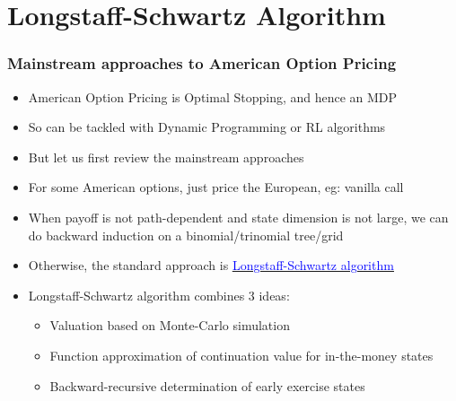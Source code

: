 \documentclass[handout]{beamer}
\begin{document}
\section{Longstaff-Schwartz Algorithm}

\begin{frame}
\frametitle{Mainstream approaches to American Option Pricing}
\pause
\begin{itemize}[<+->]
\item American Option Pricing is Optimal Stopping, and hence an MDP
\item So can be tackled with Dynamic Programming or RL algorithms
\item But let us first review the mainstream approaches
\item For some American options, just price the European, eg: vanilla call
\item When payoff is not path-dependent and state dimension is not large, we can do backward induction on a binomial/trinomial tree/grid
\item Otherwise, the standard approach is \href{https://people.math.ethz.ch/~hjfurrer/teaching/LongstaffSchwartzAmericanOptionsLeastSquareMonteCarlo.pdf}{\underline{\textcolor{blue}{Longstaff-Schwartz algorithm}}}
\item Longstaff-Schwartz algorithm combines 3 ideas:
\begin{itemize}
\item Valuation based on Monte-Carlo simulation
\item Function approximation of continuation value for in-the-money states
\item Backward-recursive determination of early exercise states
\end{itemize}
\end{itemize}
\end{frame}
\end{document}

